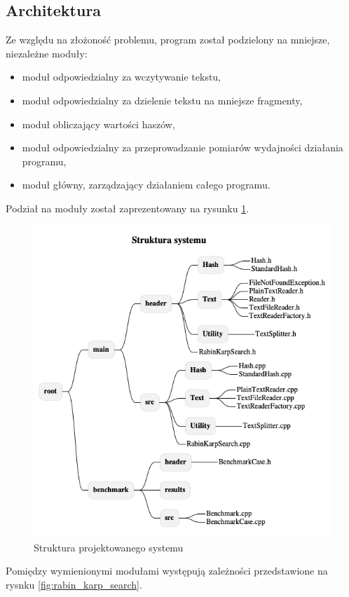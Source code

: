 \subsection{Architektura}
Ze względu na złożoność problemu, program został podzielony na mniejsze, niezależne moduły:
\begin{itemize}
    \item moduł odpowiedzialny za wczytywanie tekstu,
    \item moduł odpowiedzialny za dzielenie tekstu na mniejsze fragmenty,
    \item moduł obliczający wartości haszów,
    \item moduł odpowiedzialny za przeprowadzanie pomiarów wydajności działania programu,
    \item moduł główny, zarządzający działaniem całego programu.
\end{itemize}
Podział na moduły został zaprezentowany na rysunku \ref{fig:dir_structure}.
\begin{figure}[H]
    \centering
    \includegraphics[scale=0.65]{images/uml/DirStructure.png}
    \caption{Struktura projektowanego systemu}
    \label{fig:dir_structure}
\end{figure}
Pomiędzy wymienionymi modułami występują zależności przedstawione na rysnku \ref{fig:rabin_karp_search}.
